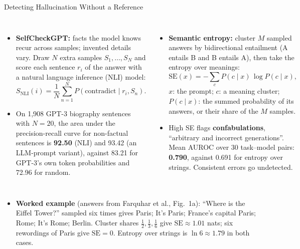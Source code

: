 \begin{frame}{Detecting Hallucination Without a Reference}
  \begin{columns}[T,onlytextwidth]
      \begin{itemize}\scriptsize\itemsep0.2em
        \item[\textcolor{red}{$\blacktriangleright$}] \textbf{SelfCheckGPT:} facts the model knows recur across samples; invented details vary. Draw $N$ extra samples $S_1,\dots,S_N$ and score each sentence $r_i$ of the answer with a natural language inference (NLI) model:
          \[ S_{\mathrm{NLI}}(i) = \frac{1}{N}\sum_{n=1}^{N} P(\text{contradict} \mid r_i, S_n). \]
        \item[\textcolor{red}{$\blacktriangleright$}] On 1{,}908 GPT-3 biography sentences with $N = 20$, the area under the precision-recall curve for non-factual sentences is \textbf{92.50} (NLI) and 93.42 (an LLM-prompt variant), against 83.21 for GPT-3's own token probabilities and 72.96 for random.
      \end{itemize}
      \begin{itemize}\scriptsize\itemsep0.2em
        \item[\textcolor{red}{$\blacktriangleright$}] \textbf{Semantic entropy:} cluster $M$ sampled answers by bidirectional entailment (A entails B and B entails A), then take the entropy over meanings:
          \[ \mathrm{SE}(x) = -\sum_{c} P(c \mid x)\,\log P(c \mid x), \]
          $x$: the prompt; $c$: a meaning cluster; $P(c \mid x)$: the summed probability of its answers, or their share of the $M$ samples.
        \item[\textcolor{red}{$\blacktriangleright$}] High SE flags \textbf{confabulations}, ``arbitrary and incorrect generations''. Mean AUROC over 30 task--model pairs: \textbf{0.790}, against 0.691 for entropy over strings. Consistent errors go undetected.
      \end{itemize}
  \end{columns}
  \begin{itemize}\scriptsize\itemsep0.2em
    \item[\textcolor{red}{$\blacktriangleright$}] \textbf{Worked example} (answers from Farquhar et al., Fig.~1a): ``Where is the Eiffel Tower?'' sampled six times gives Paris; It's Paris; France's capital Paris; Rome; It's Rome; Berlin. Cluster shares $\tfrac12, \tfrac13, \tfrac16$ give $\mathrm{SE} \approx 1.01$ nats; six rewordings of Paris give $\mathrm{SE} = 0$. Entropy over strings is $\ln 6 \approx 1.79$ in both cases.

\end{itemize}
\end{frame}
